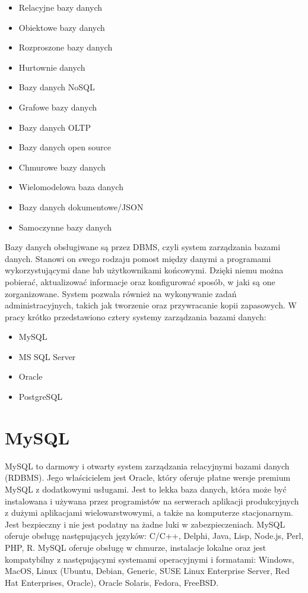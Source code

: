 \documentclass[oneside,polski,logo,indent]{amuthesis}
\begin{document}
\begin{itemize}
\item Relacyjne bazy danych
\item Obiektowe bazy danych
\item Rozproszone bazy danych
\item Hurtownie danych
\item Bazy danych NoSQL
\item Grafowe bazy danych
\item Bazy danych OLTP
\item Bazy danych open source
\item Chmurowe bazy danych
\item Wielomodelowa baza danych
\item Bazy danych dokumentowe/JSON
\item Samoczynne bazy danych
\end{itemize}

Bazy danych obsługiwane są przez DBMS, czyli system zarządzania bazami danych. Stanowi on swego rodzaju pomost między danymi a programami wykorzystującymi dane lub użytkownikami końcowymi. Dzięki niemu można pobierać, aktualizować informacje oraz konfigurować sposób, w jaki są one zorganizowane. System pozwala również na wykonywanie zadań administracyjnych, takich jak tworzenie oraz przywracanie kopii zapasowych.
W pracy krótko przedstawiono cztery systemy zarządzania bazami danych: 

\begin{itemize}
\item MySQL 
\item MS SQL Server 
\item Oracle 
\item PostgreSQL 
\end{itemize}
\section{MySQL}
MySQL to darmowy i otwarty system zarządzania relacyjnymi bazami danych (RDBMS). Jego właścicielem jest Oracle, który oferuje płatne wersje premium MySQL z dodatkowymi usługami. Jest to lekka baza danych, która może być instalowana i używana przez programistów na serwerach aplikacji produkcyjnych z dużymi aplikacjami wielowarstwowymi, a także na komputerze stacjonarnym. Jest bezpieczny i nie jest podatny na żadne luki w zabezpieczeniach. 
\indent MySQL oferuje obsługę następujących języków: C/C++, Delphi, Java, Lisp, Node.js, Perl, PHP, R.
MySQL oferuje obsługę w chmurze, instalacje lokalne oraz jest kompatybilny z następującymi systemami operacyjnymi i formatami: Windows, MacOS, Linux (Ubuntu, Debian, Generic, SUSE Linux Enterprise Server, Red Hat Enterprises, Oracle), Oracle Solaris, Fedora, FreeBSD.
\end{document}
